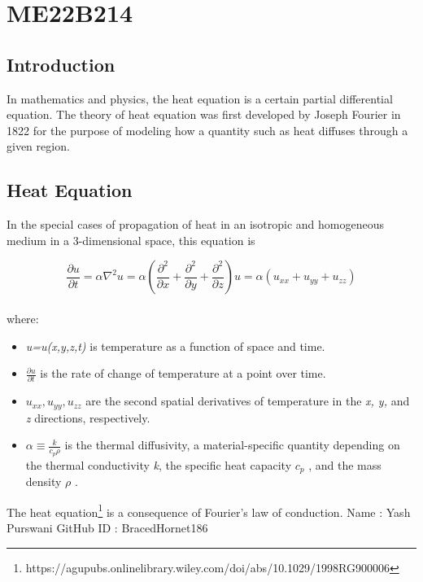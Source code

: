 \section{ME22B214}
\subsection{Introduction}
In mathematics and physics, the heat equation is a certain partial differential equation. The theory of heat equation was first developed by Joseph Fourier in 1822 for the purpose of modeling how a quantity such as heat diffuses through a given region.
\subsection{Heat Equation}
In the special cases of propagation of heat in an isotropic and homogeneous medium in a 3-dimensional space, this equation is

\begin{equation}
    \frac{\partial u}{\partial t} = \alpha\nabla^2u = \alpha \left(\frac{\partial^2}{\partial x}+\frac{\partial^2}{\partial y}+\frac{\partial^2}{\partial z}\right)u = \alpha(u_{xx}+u_{yy}+u_{zz})
    \label {eqn:heat}
\end{equation}
\\
where:
\begin{itemize}
    \item \emph{u=u(x,y,z,t)} is temperature as a function of space and time. 
    \item $\frac{\partial u}{\partial t}$ is the rate of change of temperature at a point over time.
    \item $u_{xx},u_{yy},u_{zz}$ are the second spatial derivatives of temperature in the \emph{x, y,} and \emph{z} directions, respectively.
    \item $\alpha \equiv \frac{k}{c_p\rho}$ is the thermal diffusivity, a material-specific quantity depending on the thermal conductivity \emph{k}, the specific heat capacity $c_p$ , and the mass density $\rho$ .
\end{itemize}\leavevmode
The heat equation\footnote{https://agupubs.onlinelibrary.wiley.com/doi/abs/10.1029/1998RG900006} is a consequence of Fourier's law of conduction.
Name : Yash Purswani
GitHub ID : BracedHornet186

